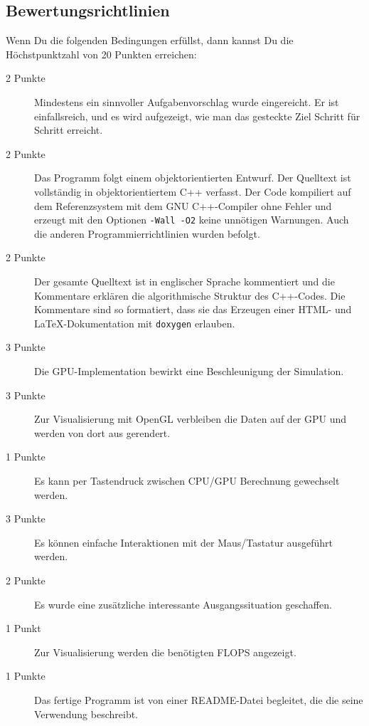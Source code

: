 \documentclass[10pt]{article}
\begin{document}
\begin{multicols}{2}
\section{Bewertungsrichtlinien}

Wenn Du die folgenden Bedingungen erfüllst, dann kannst Du die
Höchstpunktzahl von 20 Punkten erreichen:

\begin{description}
\item[2 Punkte]
        Mindestens ein sinnvoller Aufgabenvorschlag wurde eingereicht.
        Er ist einfallsreich, und es wird aufgezeigt, wie man das gesteckte Ziel
        Schritt für Schritt erreicht.
\item[2 Punkte]
        Das Programm folgt einem objektorientierten Entwurf.
        Der Quelltext ist vollständig in objektorientiertem C++ verfasst.
        Der Code kompiliert auf dem Referenzsystem mit dem GNU C++-Compiler
        ohne Fehler und erzeugt mit den Optionen \texttt{-Wall -O2} keine
        unnötigen Warnungen.
        Auch die anderen Programmierrichtlinien wurden befolgt.
\item[2 Punkte]
        Der gesamte Quelltext ist in englischer Sprache kommentiert und
        die Kommentare erklären die algorithmische Struktur des C++-Codes.
        Die Kommentare sind so formatiert, dass sie das Erzeugen einer
        HTML- und \LaTeX-Dokumentation mit \texttt{doxygen} erlauben. 
\item[3 Punkte] 
        Die GPU-Implementation bewirkt eine Beschleunigung der Simulation.
\item[3 Punkte] 
        Zur Visualisierung mit OpenGL verbleiben die Daten auf der GPU und werden von dort aus gerendert.
\item[1 Punkte]
        Es kann per Tastendruck zwischen CPU/GPU Berechnung gewechselt werden.
\item[3 Punkte] 
        Es können einfache Interaktionen mit der Maus/Tastatur ausgeführt werden.
\item[2 Punkte]
        Es wurde eine zusätzliche interessante Ausgangssituation geschaffen.
\item[1 Punkt]
        Zur Visualisierung werden die benötigten FLOPS angezeigt.
\item[1 Punkte] 
        Das fertige Programm ist von einer README-Datei begleitet, die die
        seine Verwendung beschreibt.

\end{description}




\nocite{*}


\end{multicols}
\end{document}
